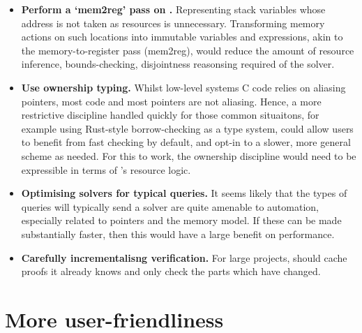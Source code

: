 \begin{itemize}
    \item \textbf{Perform a `mem2reg' pass on .} Representing stack
        variables whose address is not taken as resources is unnecessary.
        Transforming memory actions on such locations into immutable 
        variables and expressions, akin to the  memory-to-register
        pass (mem2reg), would reduce the amount of resource inference,
        bounds-checking, disjointness reasonsing required of the 
        solver.
    \item \textbf{Use ownership typing.} Whilst low-level systems C code relies
        on aliasing pointers, most code and most pointers are not aliasing. Hence,
        a more restrictive discipline handled quickly for those common
        situaitons, for example using Rust-style borrow-checking as a type
        system,
        could allow users to benefit from fast checking by default, and opt-in to a slower,
        more general scheme as needed. For this to work, the ownership
        discipline would need to be expressible in terms of 's resource
        logic.
    \item \textbf{Optimising solvers for typical queries.} It seems
        likely that the types of queries  will typically send a
        solver are quite amenable to automation, especially related
        to pointers and the  memory model. If these can be
        made substantially faster, then this would have a large
        benefit on  performance.
    \item \textbf{Carefully incrementalisng verification.} For large projects,
         should cache proofs it already knows and only check the parts
        which have changed.
\end{itemize}

\section{More user-friendliness}

